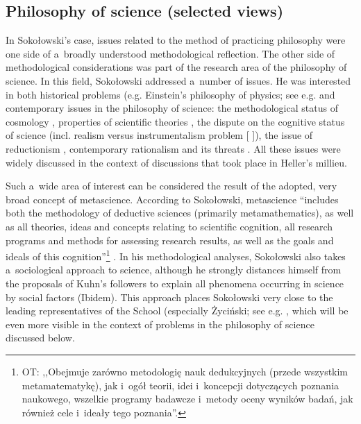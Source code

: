 \documentclass[%
  manuscript=article,
  year=2024,
  volume=77,
  doi=00000.000,
]{zfn}
\begin{document}
\subsection{ Philosophy of science (selected views)}



In Sokołowski's case, issues related to the method of practicing philosophy were one side of a~broadly understood methodological reflection. The other side of methodological considerations was part of the research area of the philosophy of science. In this field, Sokołowski addressed a~number of issues. He was interested in both historical problems (e.g. Einstein's philosophy of physics; see e.g. 
\parencites[][]{}[][]{}[][]{} %
 and contemporary issues in the philosophy of science: the methodological status of cosmology 
\parencites[][]{}[][]{}, %
 properties of scientific theories 
\parencites[][]{}[][]{}, %
 the dispute on the cognitive status of science (incl. realism versus instrumentalism problem [
\parencite[][]{}%
]), the issue of reductionism 
\parencites[][]{}[][]{}[][]{}, %
 contemporary rationalism and its threats 
\parencites[][]{}[][]{}. %
 All these issues were widely discussed in the context of discussions that took place in Heller's millieu.



Such a~wide area of interest can be considered the result of the adopted, very broad concept of metascience. According to Sokołowski, metascience ``includes both the methodology of deductive sciences (primarily metamathematics), as well as all theories, ideas and concepts relating to scientific cognition, all research programs and methods for assessing research results, as well as the goals and ideals of this cognition''\footnote{OT: ,,Obejmuje zarówno metodologię nauk dedukcyjnych (przede wszystkim metamatematykę), jak i~ogół teorii, idei i~koncepcji dotyczących poznania naukowego, wszelkie programy badawcze i~metody oceny wyników badań, jak również cele i~ideały tego poznania''.} 
\parencite[][p.57]{}. %
 In his methodological analyses, Sokołowski also takes a~sociological approach to science, although he strongly distances himself from the proposals of Kuhn's followers to explain all phenomena occurring in science by social factors (Ibidem). This approach places Sokołowski very close to the leading representatives of the School (especially Życiński; see e.g. 
\parencite[][]{}, %
 which will be even more visible in the context of problems in the philosophy of science discussed below.
\end{document}
